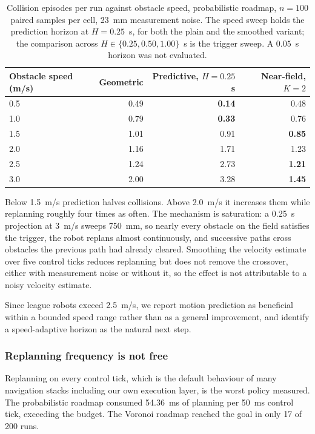 \begin{table}[t]
\centering
\small
\begin{tabular}{lrrr}
\hline
Obstacle speed (m/s) & Geometric & Predictive, $H=0.25$~s & Near-field, $K=2$ \\
\hline
0.5 & 0.49 & \textbf{0.14} & 0.48 \\
1.0 & 0.79 & \textbf{0.33} & 0.76 \\
1.5 & 1.01 & 0.91 & \textbf{0.85} \\
2.0 & 1.16 & 1.71 & 1.23 \\
2.5 & 1.24 & 2.73 & \textbf{1.21} \\
3.0 & 2.00 & 3.28 & \textbf{1.45} \\
\hline
\end{tabular}
\caption{Collision episodes per run against obstacle speed, probabilistic
roadmap, $n=100$ paired samples per cell, 23~mm measurement noise. The speed
sweep holds the prediction horizon at $H=0.25$~s, for both the plain and the
smoothed variant; the comparison across $H\in\{0.25,0.50,1.00\}$~s is the
trigger sweep. A $0.05$~s horizon was not evaluated.}
\label{tab:predictive}
\end{table}

Below 1.5~m/s prediction halves collisions. Above 2.0~m/s it increases them
while replanning roughly four times as often. The mechanism is saturation: a
0.25~s projection at 3~m/s sweeps 750~mm, so nearly every obstacle on the field
satisfies the trigger, the robot replans almost continuously, and successive
paths cross obstacles the previous path had already cleared. Smoothing the
velocity estimate over five control ticks reduces replanning but does not
remove the crossover, either with measurement noise or without it, so the
effect is not attributable to a noisy velocity estimate.

Since league robots exceed 2.5~m/s, we report motion prediction as beneficial
within a bounded speed range rather than as a general improvement, and identify
a speed-adaptive horizon as the natural next step.

\subsubsection{Replanning frequency is not free}

Replanning on every control tick, which is the default behaviour of many
navigation stacks including our own execution layer, is the worst policy
measured. The probabilistic roadmap consumed 54.36~ms of planning per 50~ms
control tick, exceeding the budget. The Voronoi roadmap reached the goal in
only 17 of 200 runs.

